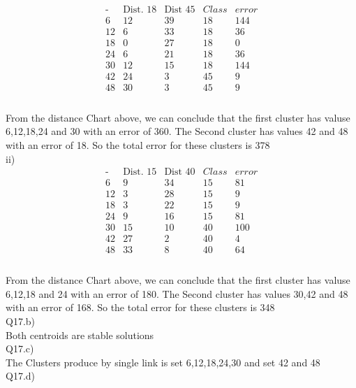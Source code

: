 \documentclass[12pt,english]{article}
\begin{document}
\begin{equation*}
\begin{array}{c|cccc}
\mbox{-}& \mbox{Dist. 18} & \mbox{Dist 45} & Class &  error\\
\hline
 6 & 12 & 39 & 18 & 144 \\
12 &  6 & 33 & 18 &  36 \\
18 &  0 & 27 & 18 &   0 \\
24 &  6 & 21 & 18 &  36 \\
30 & 12 & 15 & 18 & 144 \\
42 & 24 &  3 & 45 &   9 \\
48 & 30 &  3 & 45 &   9 \\
\end{array}
\end{equation*}\\
From the distance Chart above, we can conclude that the first cluster has valuse 6,12,18,24 and 30 with an error of 360. The Second cluster has values 42 and 48 with an error of 18. So the total error for these clusters is 378\\
ii)\\
\begin{equation*}
\begin{array}{c|cccc}
\mbox{-}& \mbox{Dist. 15} & \mbox{Dist 40} & Class &  error\\
\hline
 6 &  9 & 34 & 15 &  81 \\
12 &  3 & 28 & 15 &   9 \\
18 &  3 & 22 & 15 &   9 \\
24 &  9 & 16 & 15 &  81 \\
30 & 15 & 10 & 40 & 100 \\
42 & 27 &  2 & 40 &   4 \\
48 & 33 &  8 & 40 &   64 \\
\end{array}
\end{equation*}\\
From the distance Chart above, we can conclude that the first cluster has valuse 6,12,18 and 24 with an error of 180. The Second cluster has values 30,42 and 48 with an error of 168. So the total error for these clusters is 348\\
Q17.b)\\
Both centroids are stable solutions\\
Q17.c)\\
The Clusters produce by single link is set 6,12,18,24,30 and set 42 and 48\\
Q17.d)\\
\end{document}
